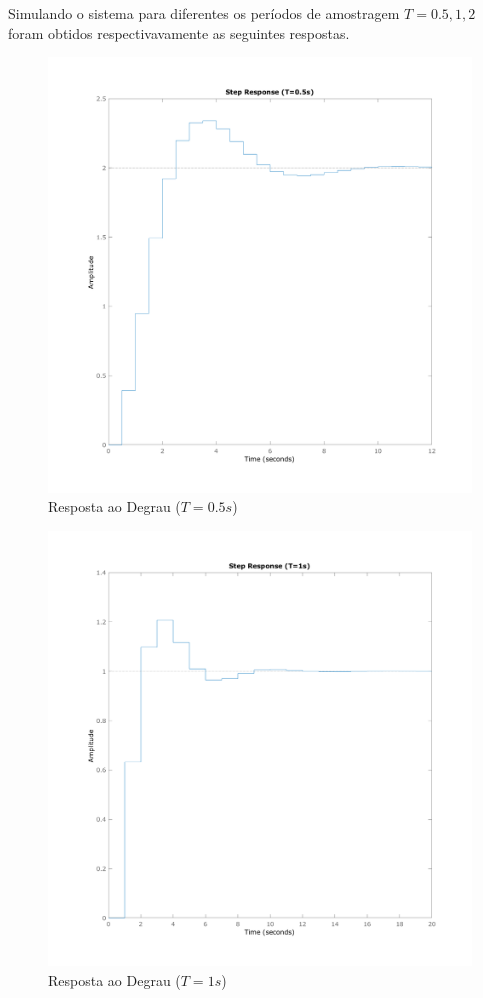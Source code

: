 \documentclass[a4paper,11pt]{article}
\begin{document}
Simulando o sistema para diferentes os períodos de amostragem $T={0.5,1,2}$ foram obtidos respectivavamente as seguintes respostas.

\begin{figure}[H]
    \centering
    \includegraphics[width=0.8\linewidth]{img/exsim3-step-t500ms.png}
    \caption{ Resposta ao Degrau ($T=0.5s$)}
\end{figure}

\begin{figure}[H]
    \centering
    \includegraphics[width=0.8\linewidth]{img/exsim3-step-t1000ms.png}
    \caption{ Resposta ao Degrau ($T=1s$)}
\end{figure}
\end{document}
